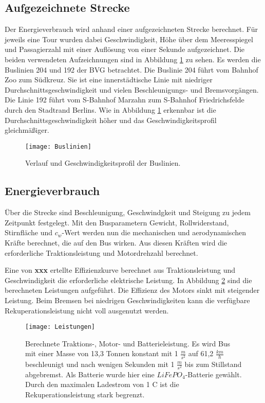 \subsection{Aufgezeichnete Strecke}
Der Energieverbrauch wird anhand einer aufgezeichneten Strecke berechnet. Für jeweils eine Tour wurden dabei Geschwindigkeit, Höhe über dem Meeresspiegel und Passagierzahl mit einer Auflösung von einer Sekunde aufgezeichnet. Die beiden verwendeten Aufzeichnungen sind in Abbildung \ref{Buslinien} zu sehen. Es werden die Buslinien 204 und 192 der BVG betrachtet. Die Buslinie 204 führt vom Bahnhof Zoo zum Südkreuz. Sie ist eine innerstädtische Linie mit niedriger Durchschnittsgeschwindigkeit und vielen Beschleunigungs- und Bremsvorgängen. Die Linie 192 führt vom S-Bahnhof Marzahn zum S-Bahnhof Friedrichsfelde durch den Stadtrand Berlins. Wie in Abbildung \ref{Buslinien} erkennbar ist die Durchschnittsgeschwindigkeit höher und das Geschwindigkeitsprofil gleichmäßiger.
\begin{figure}\centering
	\texttt{[image: Buslinien]}
	\caption[Verlauf und Geschwindigkeitsprofil der Buslinien]{Verlauf und Geschwindigkeitsprofil der Buslinien.}
	\label{Buslinien}
\end{figure}

\subsection{Energieverbrauch}
Über die Strecke sind Beschleunigung, Geschwindgkeit und Steigung zu jedem Zeitpunkt festgelegt. Mit den Busparametern Gewicht, Rollwiderstand, Stirnfläche und $c_w$-Wert werden nun die mechanischen und aerodynamischen Kräfte berechnet, die auf den Bus wirken. Aus diesen Kräften wird die erforderliche Traktionsleistung und Motordrehzahl berechnet.

Eine von \textbf{xxx} ertellte Effizienzkurve berechnet aus Traktionsleistung und Geschwindigkeit die erforderliche elektrische Leistung. In Abbildung \ref{abb_Leistungen} sind die berechneten Leistungen aufgeführt. Die Effizienz des Motors sinkt mit steigender Leistung. Beim Bremsen bei niedrigen Geschwindigkeiten kann die verfügbare Rekuperationsleistung nicht voll ausgenutzt werden.
\begin{figure}\centering
	\texttt{[image: Leistungen]}
	\caption[Berechnete Traktions-, Motor- und Batterieleistung]{Berechnete Traktions-, Motor- und Batterieleistung. Es wird Bus mit einer Masse von 13,3 Tonnen konstant mit 1 $\frac{m}{s^2}$ auf 61,2 $\frac{km}{h}$ beschleunigt und nach wenigen Sekunden mit 1 $\frac{m}{s^2}$ bis zum Stillstand abgebremst. Als Batterie wurde hier eine $LiFePO_4$-Batterie gewählt. Durch den maximalen Ladestrom von 1 C ist die Rekuperationsleistung stark begrenzt.}
	\label{abb_Leistungen}
\end{figure}

